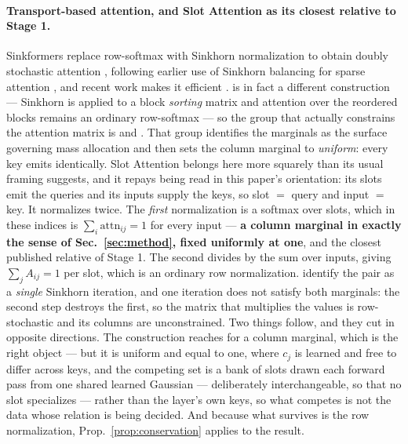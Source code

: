 \documentclass{article}
\begin{document}
\paragraph{Transport-based attention, and Slot Attention as its closest relative to Stage 1.}
Sinkformers replace row-softmax with Sinkhorn normalization to obtain doubly stochastic attention
\citep{sander2022sinkformers}, following earlier use of Sinkhorn balancing for sparse attention
\citep{tay2020sparse}, and recent work makes it efficient \citep{shahbazi2025lotformer}.
\citet{tay2020sparse} is in fact a different construction --- Sinkhorn is applied to a block
\emph{sorting} matrix and attention over the reordered blocks remains an ordinary row-softmax ---
so the group that actually constrains the attention matrix is \citet{sander2022sinkformers} and
\citet{shahbazi2025lotformer}. That group identifies the marginals as the surface governing mass
allocation and then sets the column marginal to \emph{uniform}: every key emits identically. Slot Attention
\citep{locatello2020slot} belongs here more squarely than its usual framing suggests, and it
repays being read in this paper's orientation: its slots emit the queries and its inputs supply
the keys, so slot $=$ query and input $=$ key. It normalizes twice. The \emph{first}
normalization is a softmax over slots, which in these indices is
$\sum_i \mathrm{attn}_{ij} = 1$ for every input --- \textbf{a column marginal in exactly the
sense of Sec.~\ref{sec:method}, fixed uniformly at one}, and the closest published relative of
Stage 1. The second divides by the sum over inputs, giving $\sum_j A_{ij}=1$ per slot, which is
an ordinary row normalization. \citet{zhang2023mesh} identify the pair as a \emph{single}
Sinkhorn iteration, and one iteration does not satisfy both marginals: the second step destroys
the first, so the matrix that multiplies the values is row-stochastic and its columns are
unconstrained. Two things follow, and they cut in opposite directions. The construction reaches
for a column marginal, which is the right object --- but it is uniform and equal to one, where
$c_j$ is learned and free to differ across keys, and the competing set is a bank of slots drawn
each forward pass from one shared learned Gaussian --- deliberately interchangeable, so that no
slot specializes --- rather than the layer's own keys, so what competes is not the data whose
relation is being decided. And because what survives is the row normalization,
Prop.~\ref{prop:conservation} applies to the result.
\end{document}
